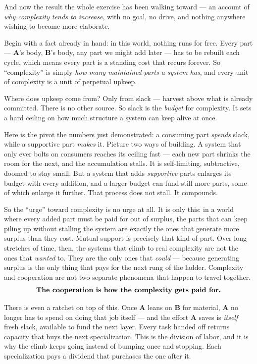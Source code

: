 \documentclass{article}
\begin{document}
And now the result the whole exercise has been walking toward --- an account of \emph{why complexity tends to increase}, with no goal, no drive, and nothing anywhere wishing to become more elaborate.

Begin with a fact already in hand: in this world, nothing runs for free. Every part --- \textbf{A}'s body, \textbf{B}'s body, any part we might add later --- has to be rebuilt each cycle, which means every part is a standing cost that recurs forever. So ``complexity'' is simply \emph{how many maintained parts a system has}, and every unit of complexity is a unit of perpetual upkeep.

Where does upkeep come from? Only from slack --- harvest above what is already committed. There is no other source. So slack is the \emph{budget} for complexity. It sets a hard ceiling on how much structure a system can keep alive at once.

Here is the pivot the numbers just demonstrated: a consuming part \emph{spends} slack, while a supportive part \emph{makes} it. Picture two ways of building. A system that only ever bolts on consumers reaches its ceiling fast --- each new part shrinks the room for the next, and the accumulation stalls. It is self-limiting, subtractive, doomed to stay small. But a system that adds \emph{supportive} parts enlarges its budget with every addition, and a larger budget can fund still more parts, some of which enlarge it further. That process does not stall. It compounds.

So the ``urge'' toward complexity is no urge at all. It is only this: in a world where every added part must be paid for out of surplus, the parts that can keep piling up without stalling the system are exactly the ones that generate more surplus than they cost. Mutual support is precisely that kind of part. Over long stretches of time, then, the systems that climb to real complexity are not the ones that \emph{wanted} to. They are the only ones that \emph{could} --- because generating surplus is the only thing that pays for the next rung of the ladder. Complexity and cooperation are not two separate phenomena that happen to travel together.
\[
\text{\textbf{The cooperation is how the complexity gets paid for.}}
\]

There is even a ratchet on top of this. Once \textbf{A} leans on \textbf{B} for material, \textbf{A} no longer has to spend on doing that job itself --- and the effort \textbf{A} saves is \emph{itself} fresh slack, available to fund the next layer. Every task handed off returns capacity that buys the next specialization. This is the division of labor, and it is why the climb keeps going instead of bumping once and stopping. Each specialization pays a dividend that purchases the one after it.
\end{document}
